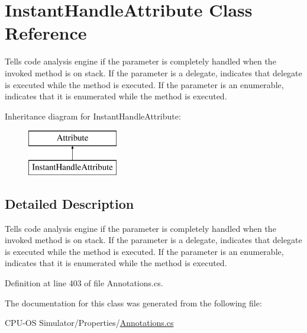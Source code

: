 \hypertarget{class_instant_handle_attribute}{}\section{Instant\+Handle\+Attribute Class Reference}
\label{class_instant_handle_attribute}


Tells code analysis engine if the parameter is completely handled when the invoked method is on stack. If the parameter is a delegate, indicates that delegate is executed while the method is executed. If the parameter is an enumerable, indicates that it is enumerated while the method is executed.  


Inheritance diagram for Instant\+Handle\+Attribute\+:\begin{figure}[H]
\begin{center}
\leavevmode
\includegraphics[height=2.000000cm]{class_instant_handle_attribute}
\end{center}
\end{figure}


\subsection{Detailed Description}
Tells code analysis engine if the parameter is completely handled when the invoked method is on stack. If the parameter is a delegate, indicates that delegate is executed while the method is executed. If the parameter is an enumerable, indicates that it is enumerated while the method is executed. 



Definition at line 403 of file Annotations.\+cs.



The documentation for this class was generated from the following file\+:\begin{DoxyCompactItemize}
\item 
C\+P\+U-\/\+O\+S Simulator/\+Properties/\hyperlink{_annotations_8cs}{Annotations.\+cs}\end{DoxyCompactItemize}
